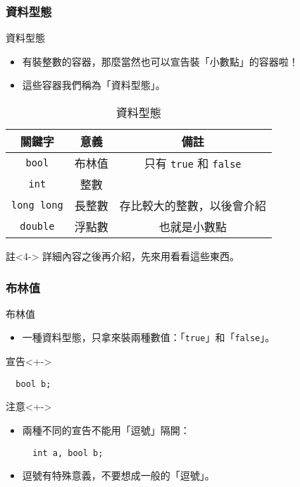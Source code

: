 \documentclass[utf8]{beamer}
\begin{document}
\begin{CJK}{UTF8}{bkai}
\begin{frame}[fragile]
  \frametitle{資料型態}
  \begin{block}{資料型態}
    \begin{itemize}
    \item<1-> 有裝整數的容器，那麼當然也可以宣告裝「小數點」的容器啦！
    \item<2-> 這些容器我們稱為「\alert{資料型態}」。
    \end{itemize}
  \end{block}
  \pause\pause
  \begin{table}[h]
    \begin{tabular}{|c|c|c|}
    \hline
    關鍵字                 & 意義 & 備註\\
    \hline
    \lstinline{bool}      & 布林值 & 只有 \lstinline{true} 和 \lstinline{false}\\
    \hline
    \lstinline{int}       & 整數 &\\
    \hline
    \lstinline{long long} & 長整數 & 存比較大的整數，以後會介紹\\
    \hline
    \lstinline{double}    & \alert{浮點數} & 也就是小數點\\
    \hline
    \end{tabular}
    \caption{資料型態}
  \end{table}
  \begin{exampleblock}{註}<4->
  詳細內容之後再介紹，先來用看看這些東西。
  \end{exampleblock}
\end{frame}

\begin{frame}[fragile]
  \frametitle{布林值}
  \begin{exampleblock}{布林值}
    \begin{itemize}[<+->]
    \item 一種資料型態，只拿來裝兩種數值：「\lstinline{true}」和「\lstinline{false}」。
    \end{itemize}
  \end{exampleblock}
  \begin{alertblock}{宣告}<+->
    \begin{lstlisting}
  bool b;
    \end{lstlisting}
  \end{alertblock}
  \begin{alertblock}{注意}<+->
    \begin{itemize}
    \item 兩種不同的宣告不能用「逗號」隔開：
      \begin{lstlisting}
  int a, bool b;
      \end{lstlisting}
    \item<+-> 逗號有\alert{特殊意義}，不要想成一般的「逗號」。
    \end{itemize}
  \end{alertblock}
\end{frame}


\end{CJK}
\end{document}
